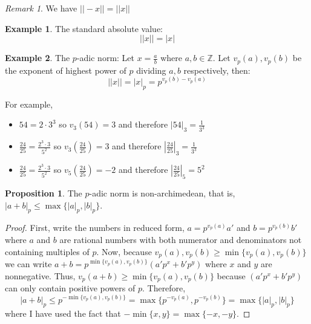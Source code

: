 \documentclass{article}
\theoremstyle{theorem}
\theoremstyle{definition}
\theoremstyle{definition}
\newtheorem*{proposition}{Proposition}
\theoremstyle{remark}
\theoremstyle{definition}
\newtheorem{example}{Example}[section]
\theoremstyle{remark}
\newtheorem{remark}{Remark}[subsection]
\begin{document}
\begin{remark} 
We have $||-x|| = ||x||$
\end{remark}

\begin{example} 
The standard absolute value:
\[||x|| = |x|\]
\end{example}

\begin{example} 
The $p$-adic norm: Let $x = \frac{a}{b}$ where $a,b\in \mathbb{Z}$. Let $v_p(a), v_p(b)$ be the exponent of highest power of $p$ dividing $a,b$ respectively, then:
\[||x|| = |x|_p = p^{v_p(b) - v_p(a)}\]

For example,

\begin{itemize}
\item $54 = 2 \cdot 3^3$ so $v_3(54) = 3$ and therefore $|54|_3 = \frac{1}{3^3}$ 

\item $\frac{24}{25} = \frac{2^3 \cdot 3}{5^2}$ so $v_3(\frac{24}{25}) = 3$ and therefore $|\frac{24}{25}|_3 = \frac{1}{3^3}$

\item $\frac{24}{25} = \frac{2^3 \cdot 3}{5^2}$ so $v_5(\frac{24}{25}) = -2$ and therefore $|\frac{24}{25}|_5 = 5^2$

\end{itemize}

\end{example}

\begin{proposition}
The $p$-adic norm is non-archimedean, that is, $|a + b|_p \le \max\{|a|_p, |b|_p\}$.  
\end{proposition}

\begin{proof}
First, write the numbers in reduced form, $a = p^{v_p(a)} a'$ and $b = p^{v_p(b)} b'$ where $a$ and $b$ are rational numbers with both numerator and denominators not containing multiples of $p$. Now, because $v_p(a), v_p(b) \ge \min\{v_p(a), v_p(b)\}$ we can write $a + b = p^{\min\{v_p(a), v_p(b)\}} (a' p^x + b' p^y)$ where $x$ and $y$ are nonnegative. Thus, $v_p(a+b) \ge \min\{v_p(a), v_p(b)\}$ because $(a' p^x + b' p^y)$ can only contain positive powers of $p$. Therefore, 
\[|a+b|_p \le p^{-\min\{v_p(a), v_p(b)\}} = \max\{p^{-v_p(a)}, p^{-v_p(b)}\} = \max\{|a|_p, |b|_p\}\]
where I have used the fact that $-\min\{x,y\} = \max\{-x, -y\}$. 
\end{proof}
\end{document}
